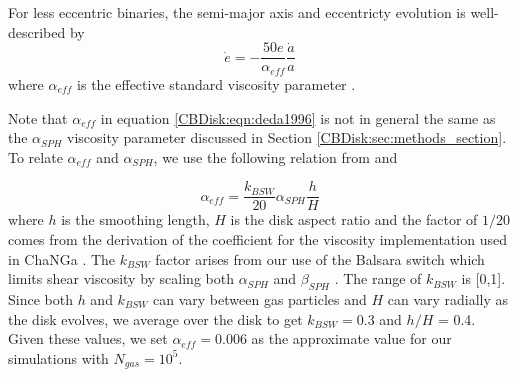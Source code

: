 For less eccentric binaries, the semi-major axis and eccentricty evolution is well-described by 
\begin{equation}
\label{CBDisk:eqn:deda1996}
\dot{e} = -\frac{50e}{\alpha_{eff}}\frac{\dot{a}}{a}
\end{equation}
where $\alpha_{eff}$ is the effective standard viscosity parameter \citep{Artymowicz1996b,Dermine2013}.  

Note that $\alpha_{eff}$ in equation \ref{CBDisk:eqn:deda1996} is not in 
general the same as the $\alpha_{SPH}$ viscosity parameter discussed in Section
\ref{CBDisk:sec:methods_section}.  To relate $\alpha_{eff}$ and $\alpha_{SPH}$, we use the following relation from \citet{Lodato2010} and \citet{Meru2012}

\begin{equation}
\label{CBDisk:eqn:alphas}
\alpha_{eff} = \frac{k_{BSW}}{20} \alpha_{SPH} \frac{h}{H}
\end{equation}
where $h$ is the smoothing length, $H$ is the disk aspect ratio and the factor of $1/20$ comes from the \citet{Meru2012} derivation of the coefficient for 
the \citet{Monaghan1983} viscosity implementation used in ChaNGa \citep{Murray1996}.  The $k_{BSW}$ factor arises from our use of the  Balsara switch which 
limits shear viscosity by scaling both $\alpha_{SPH}$ and $\beta_{SPH}$ \citep{Balsara1995}.  The range of $k_{BSW}$ is [0,1].  Since both $h$ and $k_{BSW}$ 
can vary between gas particles and $H$ can vary radially as the disk evolves, we average over the disk to get $k_{BSW} = 0.3$ and $h/H$ = 0.4.  Given these 
values, we set $\alpha_{eff} = 0.006$ as the approximate value for our simulations with $N_{gas} = 10^5$.

